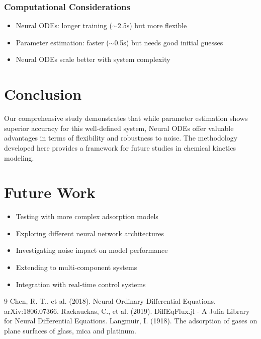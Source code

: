 \documentclass[12pt]{article}
\begin{document}
\subsubsection{Computational Considerations}
\begin{itemize}
    \item Neural ODEs: longer training ($\sim$2.5s) but more flexible
    \item Parameter estimation: faster ($\sim$0.5s) but needs good initial guesses
    \item Neural ODEs scale better with system complexity
\end{itemize}

\section{Conclusion}

Our comprehensive study demonstrates that while parameter estimation shows superior accuracy for this well-defined system, Neural ODEs offer valuable advantages in terms of flexibility and robustness to noise. The methodology developed here provides a framework for future studies in chemical kinetics modeling.

\section{Future Work}

\begin{itemize}
    \item Testing with more complex adsorption models
    \item Exploring different neural network architectures
    \item Investigating noise impact on model performance
    \item Extending to multi-component systems
    \item Integration with real-time control systems
\end{itemize}

\clearpage
\begin{thebibliography}{9}
 Chen, R. T., et al. (2018). Neural Ordinary Differential Equations. arXiv:1806.07366.
 Rackauckas, C., et al. (2019). DiffEqFlux.jl - A Julia Library for Neural Differential Equations.
 Langmuir, I. (1918). The adsorption of gases on plane surfaces of glass, mica and platinum.
\end{thebibliography}
\end{document}
